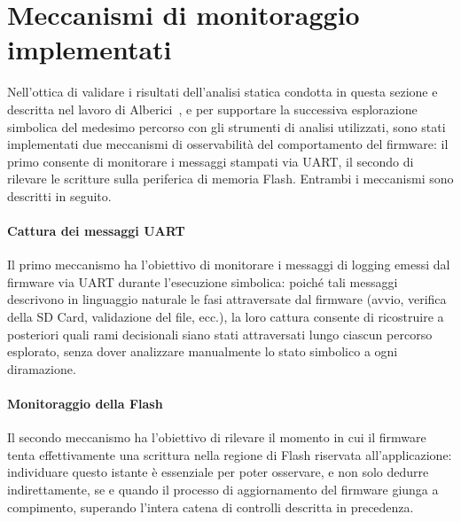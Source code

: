     \section{Meccanismi di monitoraggio implementati}
    \label{subsec:meccanismi_di_monitoraggio}
        Nell'ottica di validare i risultati dell'analisi statica condotta in questa sezione e descritta nel lavoro di Alberici~\cite{alberici26}, e per supportare la successiva esplorazione simbolica del medesimo percorso con gli strumenti di analisi utilizzati, sono stati implementati due meccanismi di osservabilità del comportamento del firmware: il primo consente di monitorare i messaggi stampati via UART, il secondo di rilevare le scritture sulla periferica di memoria Flash. Entrambi i meccanismi sono descritti in seguito.

        \paragraph{Cattura dei messaggi UART}
            Il primo meccanismo ha l'obiettivo di monitorare i messaggi di logging emessi dal firmware via UART durante l'esecuzione simbolica: poiché tali messaggi descrivono in linguaggio naturale le fasi attraversate dal firmware (avvio, verifica della SD Card, validazione del file, ecc.), la loro cattura consente di ricostruire a posteriori quali rami decisionali siano stati attraversati lungo ciascun percorso esplorato, senza dover analizzare manualmente lo stato simbolico a ogni diramazione.

        \paragraph{Monitoraggio della Flash}
            Il secondo meccanismo ha l'obiettivo di rilevare il momento in cui il firmware tenta effettivamente una scrittura nella regione di Flash riservata all'applicazione: individuare questo istante è essenziale per poter osservare, e non solo dedurre indirettamente, se e quando il processo di aggiornamento del firmware giunga a compimento, superando l'intera catena di controlli descritta in precedenza.
